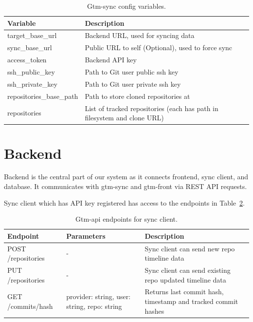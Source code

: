 \begin{table}[H]
    \centering
    \begin{tabular}{ | p{6cm} | p{6cm} |}
        \hline
        \textbf{Variable} & \textbf{Description}\\
        \hline
        target\_base\_url & Backend URL, used for syncing data \\
        \hline
        sync\_base\_url &  Public URL to self (Optional), used to force sync\\
        \hline
        access\_token & Backend API key\\
        \hline
        ssh\_public\_key & Path to Git user public ssh key\\
        \hline
        ssh\_private\_key & Path to Git user private ssh key\\
        \hline
        repositories\_base\_path & Path to store cloned repositories at\\
        \hline
        repositories & List of tracked repositories (each has path in filesystem and clone URL)\\
        \hline
    \end{tabular}
    \caption{Gtm-sync config variables.}
    \label{tab:gtm-sync-config}
\end{table}

\section{Backend}\label{sec:backend-content}
Backend is the central part of our system as it connects frontend, sync client, and database.
It communicates with gtm-sync and gtm-front via REST API requests.

Sync client which has API key registered has access to the endpoints in Table~\ref{tab:gtm-api-endpoints-for-sync}.
\begin{table}[H]
    \centering
    \begin{tabular}{ | p{5cm} | p{4cm} | p{5cm} |}
        \hline
        \textbf{Endpoint} & \textbf{Parameters} & \textbf{Description}\\
        \hline
        POST /repositories & - & Sync client can send new repo timeline data \\
        \hline
        PUT /repositories & - & Sync client can send existing repo updated timeline data\\
        \hline
        GET /commits/hash & provider: string, user: string, repo: string & Returns last commit hash, timestamp and tracked commit hashes\\
        \hline
    \end{tabular}
    \caption{Gtm-api endpoints for sync client.}
    \label{tab:gtm-api-endpoints-for-sync}
\end{table}

